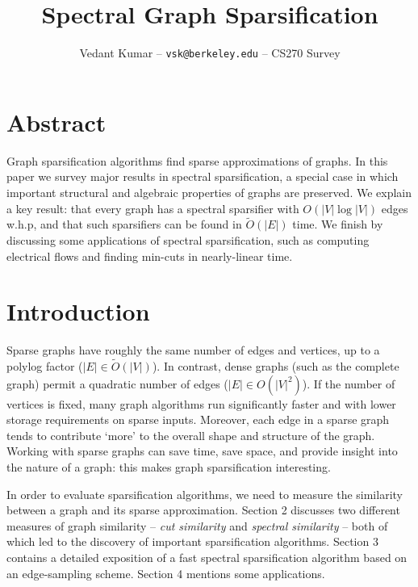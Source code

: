 \documentclass{article}
\title{Spectral Graph Sparsification}
\author{\small{Vedant Kumar -- \texttt{vsk@berkeley.edu} -- CS270 Survey}}
\begin{document}
\maketitle

\newcommand \R{\mathbb{R}}
\newcommand \one{\mathbf{1}}
\newcommand \zero{\mathbf{0}}
\newcommand \Tr{\text{Tr}}
\newcommand \im{\text{im}}
\newcommand \Span{\text{span}}
\newcommand \cut[1]{\text{cut}_{#1}}
\newcommand \textlcsc[1]{\textsc{\MakeLowercase{#1}}}

\section*{Abstract}

Graph sparsification algorithms find sparse approximations of graphs. In
this paper we survey major results in spectral sparsification, a special
case in which important structural and algebraic properties of graphs are
preserved. We explain a key result: that every graph has a spectral
sparsifier with $O(|V|\log|V|)$ edges w.h.p, and that such sparsifiers can
be found in $\tilde{O}(|E|)$ time. We finish by discussing some applications
of spectral sparsification, such as computing electrical flows and finding
min-cuts in nearly-linear time.

\section{Introduction}

Sparse graphs have roughly the same number of edges and vertices, up to a
polylog factor ($|E| \in \tilde{O}(|V|)$). In contrast, dense graphs (such
as the complete graph) permit a quadratic number of edges ($|E| \in
O(|V|^2)$). If the number of vertices is fixed, many graph algorithms run
significantly faster and with lower storage requirements on sparse inputs.
Moreover, each edge in a sparse graph tends to contribute `more' to the
overall shape and structure of the graph.  Working with sparse graphs can
save time, save space, and provide insight into the nature of a graph: this
makes graph sparsification interesting.

In order to evaluate sparsification algorithms, we need to measure the
similarity between a graph and its sparse approximation. Section 2 discusses
two different measures of graph similarity -- \textit{cut similarity} and
\textit{spectral similarity} -- both of which led to the discovery of
important sparsification algorithms. Section 3 contains a detailed
exposition of a fast spectral sparsification algorithm based on an
edge-sampling scheme. Section 4 mentions some applications.
\end{document}
